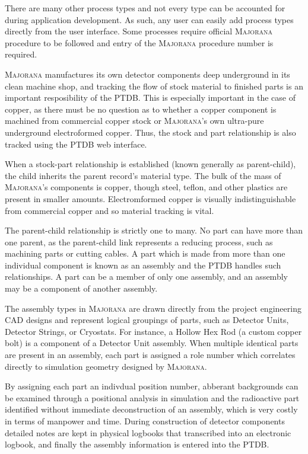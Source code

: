 \documentclass[journal]{IEEEtran}
\begin{document}
There are many other process types and not every type can
be accounted for during application development. As such, any user can 
easily add process types directly from the user interface. Some processes require official \textsc{Majorana} procedure to be
followed and entry of the \textsc{Majorana} procedure number is required.

\textsc{Majorana} manufactures its own detector components deep underground in its clean machine shop, and tracking the 
flow of stock material to finished parts is an important resposibility of the PTDB. This is especially important in the case of
copper, as there must be no question as to whether a copper component is machined from commercial copper stock or
\textsc{Majorana}'s own ultra-pure underground electroformed copper. Thus, the stock and part relationship is also tracked using
the PTDB web interface. 

When a stock-part relationship is established (known generally as parent-child), the child inherits the parent record's
material type. The bulk of the mass of \textsc{Majorana}'s components is copper, though steel, teflon, and other plastics are 
present in smaller amounts. Electromformed copper is visually indistinguishable from commercial copper and so material
tracking is vital.

The parent-child relationship is strictly one to many. No part can have more than one parent, as the parent-child link
represents a reducing process, such as machining parts or cutting cables. A part which is made from more than one individual
component is known as an assembly and the PTDB handles such relationships. A part can be a member of only one assembly,
and an assembly may be a component of another assembly.

The assembly types in \textsc{Majorana} are drawn directly from the project engineering CAD designs and represent logical 
groupings of parts, such as Detector Units, Detector Strings, or Cryostats. For instance, a Hollow Hex Rod 
(a custom copper bolt) is a component of a Detector Unit assembly. When multiple identical parts are present in an assembly,
each part is assigned a role number which correlates directly to simulation geometry designed by \textsc{Majorana}. 

By assigning each part an indivdual position number, abberant backgrounds can be examined through a positional analysis in 
simulation and the radioactive part identified without immediate deconstruction of an assembly, which is very costly in 
terms of manpower and time. During construction of detector components detailed notes are kept in physical logbooks that
transcribed into an electronic logbook, and finally the assembly information is entered into the PTDB.
\end{document}
